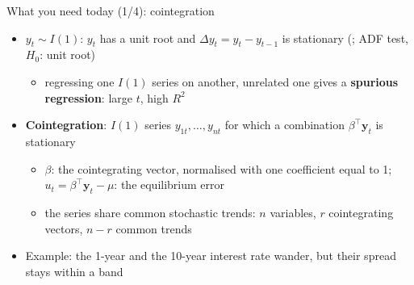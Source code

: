 \begin{frame}{What you need today (1/4): cointegration}
\itemsize{\small}
\begin{itemize}
    \item $y_t \sim I(1)$: $y_t$ has a unit root and $\Delta y_t = y_t - y_{t-1}$ is stationary (; ADF test, $H_0$: unit root)
    \begin{itemize}
        \item regressing one $I(1)$ series on another, unrelated one gives a \textbf{spurious regression}: large $t$, high $R^2$
    \end{itemize}
    \item \textbf{Cointegration}: $I(1)$ series $y_{1t}, \dots, y_{nt}$ for which a combination $\beta^\top\mathbf y_t$ is stationary
    \begin{itemize}
        \item $\beta$: the cointegrating vector, normalised with one coefficient equal to 1; $u_t = \beta^\top\mathbf y_t - \mu$: the equilibrium error
        \item the series share common stochastic trends: $n$ variables, $r$ cointegrating vectors, $n - r$ common trends
    \end{itemize}
    \item Example: the 1-year and the 10-year interest rate wander, but their spread stays within a band
\end{itemize}
\end{frame}

